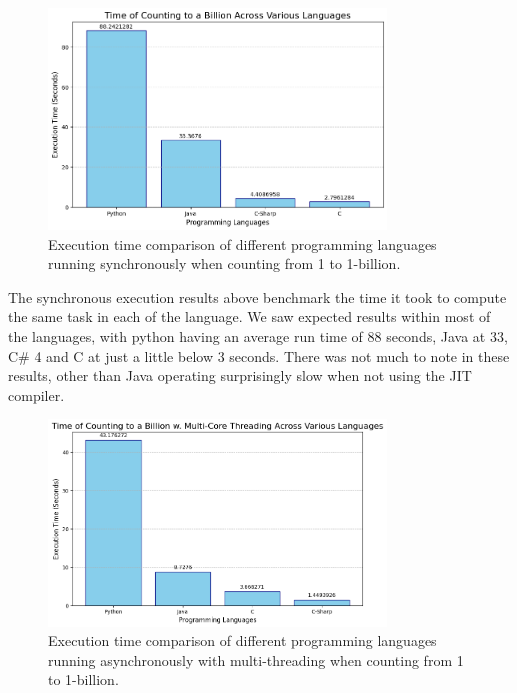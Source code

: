 \documentclass[12pt,a4paper]{article}
\begin{document}
\begin{figure}[H]
    \centering
    \includegraphics[width=0.8\textwidth]{../sync_records/sync_exec_times.png}
    \captionsetup{font=small, justification=centering}
    \caption{Execution time comparison of different programming languages running synchronously when counting from 1 to 1-billion.}
    \label{fig:sync-exec-times}
\end{figure}

The synchronous execution results above benchmark the time it took to compute the same task in each of the language. We saw expected results within most of the languages, with python having an average run time of 88 seconds, Java at 33, C\# 4 and C at just a little below 3 seconds. There was not much to note in these results, other than Java operating surprisingly slow when not using the JIT compiler.

\begin{figure}[H]
    \centering
    \includegraphics[width=0.8\textwidth]{../async_records/async_exec_times.png}
    \captionsetup{font=small, justification=centering}
    \caption{Execution time comparison of different programming languages running asynchronously with multi-threading when counting from 1 to 1-billion.}
    \label{fig:async-exec-times}
\end{figure}
\end{document}
